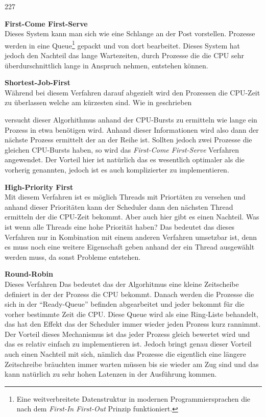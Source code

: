 \begin{dinglist}{227}
	\item{\textbf{First-Come First-Serve}} \\
	Dieses System kann man sich wie eine Schlange an der Post vorstellen. Prozesse werden in eine Queue\footnote{Eine weitverbreitete Datenstruktur in modernen Programmiersprachen die nach dem \textit{First-In First-Out} Prinzip funktioniert.} gepackt und von dort bearbeitet. Dieses System hat jedoch den Nachteil das lange Wartezeiten, durch Prozesse die die CPU sehr \"uberdurschnittlich lange in Anspruch nehmen, entstehen k\"onnen.\newpage
	\item{\textbf{Shortest-Job-First}}\\
	W\"ahrend bei diesem Verfahren darauf abgezielt wird den Prozessen die CPU-Zeit zu \"uberlassen welche am k\"urzesten sind. Wie in \cite[189]{scheduling} geschrieben 
\begin{quote}
\end{quote}
versucht dieser Algorhithmus anhand der CPU-Bursts\parencite[vgl.][184]{scheduling} zu ermitteln wie lange ein Prozess in etwa ben\"otigen wird. Anhand dieser Informationen wird also dann der n\"achste Prozess ermittelt der an der Reihe ist.
Sollten jedoch zwei Prozesse die gleichen CPU-Bursts haben, so wird das \textit{First-Come First-Serve} Verfahren angewendet. Der Vorteil hier ist nat\"urlich das es wesentlich optimaler als die vorherig genannten, jedoch ist es auch komplizierter zu implementieren.
\item{\textbf{High-Priority First}}\\
Mit diesem Verfahren ist es m\"oglich Threads mit Priort\"aten zu versehen und anhand dieser Priorit\"aten kann der Scheduler dann den n\"achsten Thread ermitteln der die CPU-Zeit bekommt. Aber auch hier gibt es einen Nachteil. Was ist wenn alle Threads eine hohe Priorit\"at haben? Das bedeutet das dieses Verfahren nur in Kombination mit einem anderen Verfahren umsetzbar ist, denn es muss noch eine weitere Eigenschaft geben anhand der ein Thread ausgew\"ahlt werden muss, da sonst Probleme entstehen.
	\item{\textbf{Round-Robin}}\\
	Dieses Verfahren 
		\parencite[vgl.][194]{scheduling}
Das bedeutet das der Algorhitmus eine kleine Zeitscheibe definiert in der der Prozess die CPU bekommt. Danach werden die Prozesse die sich in der ``Ready-Queue'' befinden abgearbeitet und jeder bekommt f\"ur die vorher bestimmte Zeit die CPU. Diese Queue wird als eine Ring-Liste behandelt, das hat den Effekt das der Scheduler immer wieder jeden Prozess kurz rannimmt. Der Vorteil dieses Mechanismus ist das jeder Prozess gleich bewertet wird und das es relativ einfach zu implementieren ist. Jedoch bringt genau dieser Vorteil auch einen Nachteil mit sich, n\"amlich das Prozesse die eigentlich eine l\"angere Zeitschreibe br\"auchten immer warten m\"ussen bis sie wieder am Zug sind und das kann nat\"urlich zu sehr hohen Latenzen in der Ausf\"uhrung kommen.
\end{dinglist}
